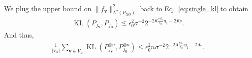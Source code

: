 \documentclass[11pt]{article}
\newcommand{\bv}{\mathbf v}
\newcommand{\0}{\mathbf{0}}
\begin{document}
\begin{appendix}
\begin{align}
\end{align}
We plug the upper bound on $\|f_{\bv}\|^2_{L^2(P_{XO})}$ back to Eq.~\eqref{eq:single_kl} to obtain
\begin{align}\label{eq:kl_upper_bound_small}
    \operatorname{KL}\left(P_{f_\bv}, P_{f_{\boldsymbol{0}}} \right) \lesssim \epsilon_0^2 \sigma^{-2} 2^{-2\mathfrak{K}\frac{\underline{s}d_x}{s_x} \eta_1 -2\mathfrak{K}\underline{s}}.
\end{align}
And thus,
\begin{align}
\label{eq:KL_upper_bound}
    \frac{1}{|V_\mathfrak{K}|}\sum_{\bv\in V_\mathfrak{K}}\operatorname{KL}\left(P_{f_\bv}^{\otimes n}, P_{f_{\boldsymbol{0}}}^{\otimes n} \right) \leq \epsilon_0^2 n\sigma^{-2} 2^{-2\mathfrak{K}\frac{\underline{s}d_x}{s_x} \eta_1 -2\mathfrak{K}\underline{s}}.
\end{align}


\end{appendix}
\end{document}
